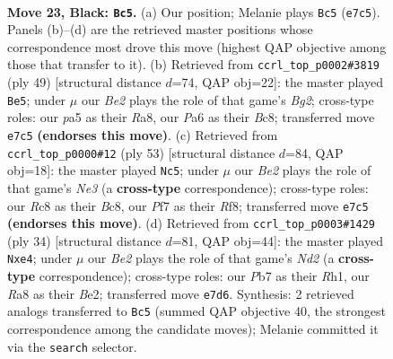 \documentclass[11pt]{article}
\begin{document}
\clearpage

\begin{figure}[p]\centering
\begin{subfigure}{0.46\textwidth}\centering
\resizebox{\linewidth}{!}{%
\newchessgame
\chessboard[
  setfen={r1r5/1ppnbp1P/p5k1/P2NP1p1/2N1P1b1/1P6/8/R3KB1R b KQ - 2 23},
  showmover=false,
  pgfstyle=straightmove, color=movearrow, markmove={e7-c5}
]}
\caption{}
\end{subfigure}\hfill
\begin{subfigure}{0.46\textwidth}\centering
\resizebox{\linewidth}{!}{%
\newchessgame
\chessboard[
  setfen={r1b1r1k1/3np1bp/p3N1p1/P7/2p3P1/2N4P/1PP3K1/R1B1R3 b - - 0 25},
  showmover=false,
  pgfstyle=straightmove, color=movearrow, markmove={g7-e5}
]}
\caption{}
\end{subfigure}
\\[4pt]
\begin{subfigure}{0.46\textwidth}\centering
\resizebox{\linewidth}{!}{%
\newchessgame
\chessboard[
  setfen={2b2rk1/1r3p1p/3pn1p1/3NpP2/4P3/2P3PP/R5B1/3R2K1 b - - 0 27},
  showmover=false,
  pgfstyle=straightmove, color=movearrow, markmove={e6-c5}
]}
\caption{}
\end{subfigure}\hfill
\begin{subfigure}{0.46\textwidth}\centering
\resizebox{\linewidth}{!}{%
\newchessgame
\chessboard[
  setfen={r1b1r1k1/pp3p2/2n3pp/2p5/P3n3/2PRB3/2PNBPPP/2K4R w - - 4 18},
  showmover=false,
  pgfstyle=straightmove, color=movearrow, markmove={d2-e4}
]}
\caption{}
\end{subfigure}
\caption{\textbf{Move 23, Black: \texttt{Bc5}.} (a) Our position; Melanie plays \texttt{Bc5} (\texttt{e7c5}). Panels (b)--(d) are the retrieved master positions whose correspondence most drove this move (highest QAP objective among those that transfer to it). (b) Retrieved from \texttt{ccrl\_top\_p0002\#3819} (ply 49) [structural distance $d$=74, QAP obj=22]: the master played \texttt{Be5}; under $\mu$ our \emph{Be2} plays the role of that game's \emph{Bg2}; cross-type roles: our \emph{p}a5 as their \emph{R}a8, our \emph{P}a6 as their \emph{B}c8; transferred move \texttt{e7c5} \textbf{(endorses this move)}. (c) Retrieved from \texttt{ccrl\_top\_p0000\#12} (ply 53) [structural distance $d$=84, QAP obj=18]: the master played \texttt{Nc5}; under $\mu$ our \emph{Be2} plays the role of that game's \emph{Ne3} (a \textbf{cross-type} correspondence); cross-type roles: our \emph{R}c8 as their \emph{B}c8, our \emph{P}f7 as their \emph{R}f8; transferred move \texttt{e7c5} \textbf{(endorses this move)}. (d) Retrieved from \texttt{ccrl\_top\_p0003\#1429} (ply 34) [structural distance $d$=81, QAP obj=44]: the master played \texttt{Nxe4}; under $\mu$ our \emph{Be2} plays the role of that game's \emph{Nd2} (a \textbf{cross-type} correspondence); cross-type roles: our \emph{P}b7 as their \emph{R}h1, our \emph{R}a8 as their \emph{B}e2; transferred move \texttt{e7d6}. Synthesis: 2 retrieved analogs transferred to \texttt{Bc5} (summed QAP objective 40, the strongest correspondence among the candidate moves); Melanie committed it via the \texttt{search} selector.}
\label{fig:thought-m45}
\end{figure}
\end{document}
